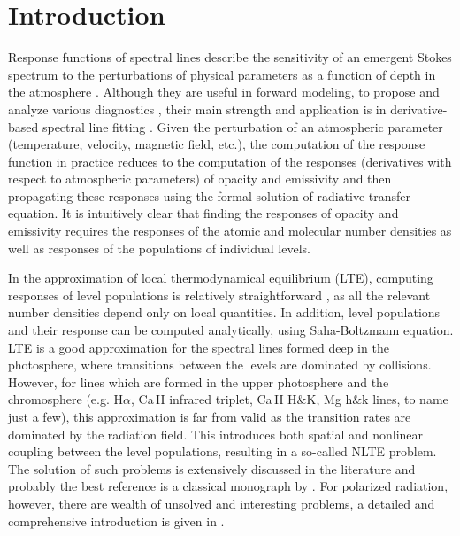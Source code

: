\documentclass[referee]{aa}
\begin{document}

   \maketitle


\section{Introduction}

Response functions of spectral lines \citep{Mein71, Beckers75, Landi77} describe the sensitivity of an emergent Stokes spectrum to the perturbations of physical parameters as a function of depth in the atmosphere \citep[for a detailed study of the possible diagnostics see][]{RFs94}. Although they are useful in forward modeling, to propose and analyze various diagnostics \citep[e.g.][]{Han06}, their main strength and application is in derivative-based spectral line fitting \citep[in solar physics widely known as ``inversion'', see for example][]{SIR}. Given the perturbation of an atmospheric parameter (temperature, velocity, magnetic field, etc.), the computation of the response function in practice reduces to the computation of the responses (derivatives with respect to atmospheric parameters) of opacity and emissivity and then propagating these responses using the formal solution of radiative transfer equation. It is intuitively clear that finding the responses of opacity and emissivity requires the responses of the atomic and molecular number densities as well as responses of the populations of individual levels. 

In the approximation of local thermodynamical equilibrium (LTE), computing responses of level populations is relatively straightforward \citep[e.g.][]{SIR, dtibook}, as all the relevant number densities depend only on local quantities. In addition, level populations and their response can be computed analytically, using Saha-Boltzmann equation. LTE is a good approximation for the spectral lines formed deep in the photosphere, where transitions between the levels are dominated by collisions. However, for lines which are formed in the upper photosphere and the chromosphere (e.g. H$\alpha$, Ca\,II infrared triplet, Ca\,II H\&K, Mg h\&k lines, to name just a few), this approximation is far from valid as the transition rates are dominated by the radiation field. This introduces both spatial and nonlinear coupling between the level populations, resulting in a so-called NLTE problem. The solution of such problems is extensively discussed in the literature and probably the best reference is a classical monograph by \citet{Mihalasbook} \citep[or a recent re-issue by][]{SAbook2014}. For polarized radiation, however, there are wealth of unsolved and interesting problems, a detailed and comprehensive introduction is given in \citet{LL04}.
\end{document}
